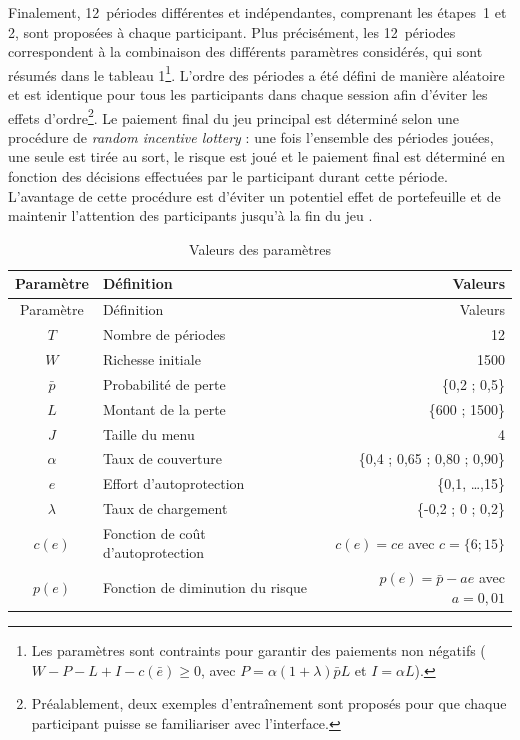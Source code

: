 \begin{Article}
\begin{refsection}[Mouminoux]
Finalement, 12~périodes différentes et indépendantes, comprenant les étapes~1 et 2, sont proposées à chaque participant. Plus précisément, les 12~périodes correspondent à la combinaison des différents paramètres considérés, qui sont résumés dans le tableau 1\footnote{Les paramètres sont contraints pour garantir des paiements non négatifs ($W-P-L+ I - c(\bar{e}) \ge 0 $, avec $P= \alpha(1+\lambda)\bar pL$ et $I= \alpha L$).}. L'ordre des périodes a été défini de manière aléatoire et est identique pour tous les participants dans chaque session afin d'éviter les effets d'ordre\footnote{Préalablement, deux exemples d’entraînement sont proposés pour que chaque participant puisse se familiariser avec l’interface.}. Le paiement final du jeu principal est déterminé selon une procédure de \textit{random incentive lottery} : une fois l’ensemble des périodes jouées, une seule est tirée au sort, le risque est joué et le paiement final est déterminé en fonction des décisions effectuées par le participant durant cette période. L’avantage de cette procédure est d’éviter un potentiel effet de portefeuille et de maintenir l’attention des participants jusqu’à la fin du jeu \parencite{cgh16}.

{\tabletextsize
  \begin{longtable}[c]{clr}
    \caption{Valeurs des paramètres}
    \label{tab:parameters}\\
    
    \toprule
    Paramètre&Définition&Valeurs\\
    \midrule
    \endfirsthead
    
    \midrule
    Paramètre&Définition&Valeurs\\
    \midrule
    \endhead
    
    \midrule
    \endfoot
    
    \bottomrule
    \endlastfoot
    $T$&Nombre de périodes&12\\
    $W$&Richesse initiale&1500\\
    $\bar{p}$&Probabilité de perte&\{0,2 ; 0,5\}\\
    $L$&Montant de la perte&\{600 ; 1500\}\\
    $J$&Taille du menu&4\\
    $\alpha$&Taux de couverture&\{0,4 ; 0,65 ; 0,80 ; 0,90\}\\
    $e$&Effort d'autoprotection&\{0,1, \ldots,15\}\\
    $\lambda$&Taux de chargement&\{-0,2 ; 0 ; 0,2\}\\
    $c(e)$&Fonction de coût d'autoprotection&$c(e)=c e $ avec $
    c = \{6 ; 15\}$\\
    $p(e)$&Fonction de diminution du risque &$p(e)=\bar{p} - a e $ avec $ a=0,01$\\
    \end{longtable}
}


\end{refsection}
\end{Article}

